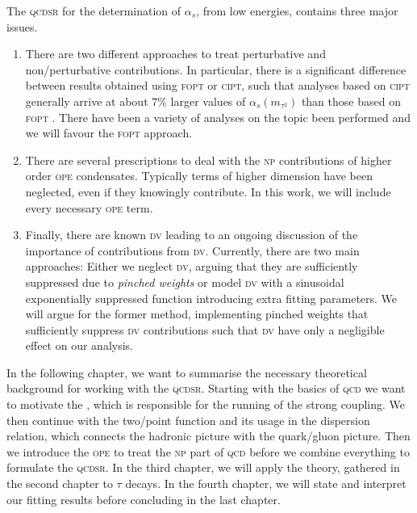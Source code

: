 \documentclass[../../index.tex]{subfiles}
\begin{document}
The \textsc{qcdsr} for the determination of \(\alpha_s\), from low energies,
contains three major issues.
\begin{enumerate}
\item There are two different approaches to treat perturbative and
  non\-/perturbative contributions. In particular, there is a significant
  difference between results obtained using \textsc{fopt} or \textsc{cipt}, such
  that analyses based on \textsc{cipt} generally arrive at about \(7\%\) larger
  values of \(\alpha_s(m_{\tau^2})\) than those based on \textsc{fopt}
  \cite{PDG2018}. There have been a variety of analyses on the topic been
  performed \cite{Pich2013,Caprini2009,Jamin2005} and we will favour the
  \textsc{fopt} approach.
\item There are several prescriptions to deal with the \textsc{np} contributions
  of higher order \textsc{ope} condensates. Typically terms of higher dimension
  have been neglected, even if they knowingly contribute. In this work, we will
  include every necessary \textsc{ope} term.

\item Finally, there are known \textsc{dv} leading to an ongoing discussion of
  the importance of contributions from \textsc{dv}. Currently, there are two
  main approaches: Either we neglect \textsc{dv}, arguing that they are
  sufficiently suppressed due to \textit{pinched weights} \cite{Pich2016} or
  model \textsc{dv} with a sinusoidal exponentially suppressed function
  \cite{Cata2008,Boito2011a,Boito2014} introducing extra fitting parameters. We
  will argue for the former method, implementing pinched weights that
  sufficiently suppress \textsc{dv} contributions such that \textsc{dv} have
  only a negligible effect on our analysis.
\end{enumerate}

In the following chapter, we want to summarise the necessary
theoretical background for working with the \textsc{qcdsr}. Starting with the
basics of \textsc{qcd} we want to motivate the , which is responsible for the running of the strong coupling.
We then continue with the two\-/point function and its usage in the dispersion
relation, which connects the hadronic picture with the quark\-/gluon picture.
Then we introduce the \textsc{ope} to treat the \textsc{np} part of \textsc{qcd}
before we combine everything to formulate the \textsc{qcdsr}. In the third
chapter, we will apply the theory, gathered in the second chapter to \(\tau\)
decays. In the fourth chapter, we will state and interpret our fitting results
before concluding in the last chapter.
\end{document}

